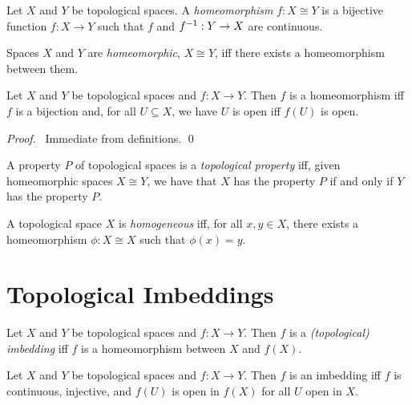 \begin{df}[Homeomorphism]
  Let $X$ and $Y$ be topological spaces. A \emph{homeomorphism} $f : X \cong Y$ is a bijective function $f : X \rightarrow Y$ such that $f$ and ${f}^{-1} : Y \rightarrow X$ are continuous.

  Spaces $X$ and $Y$ are \emph{homeomorphic}, $X \cong Y$, iff there exists a homeomorphism between them.
\end{df}

\begin{prop}
  Let $X$ and $Y$ be topological spaces and $f : X \rightarrow Y$. Then $f$ is a homeomorphism iff $f$ is a bijection and, for all $U \subseteq X$, we have $U$ is open iff $f(U)$ is open.
\end{prop}

\begin{proof}
  \pf\ Immediate from definitions. \qed
\end{proof}

\begin{df}
  A property $P$ of topological spaces is a \emph{topological property} iff, given homeomorphic spaces $X \cong Y$, we have that $X$ has the property $P$ if and only if $Y$ has the property $P$.
\end{df}

\begin{df}[Homogeneous]
  A topological space $X$ is \emph{homogeneous} iff, for all $x, y \in X$, there exists a homeomorphism $\phi : X \cong X$ such that $\phi(x) = y$.
\end{df}

\section{Topological Imbeddings}

\begin{df}
  Let $X$ and $Y$ be topological spaces and $f : X \rightarrow Y$. Then $f$ is a \emph{(topological) imbedding} iff $f$ is a homeomorphism between $X$ and $f(X)$.
\end{df}

\begin{prop}
  \label{prop:imbedding}
  Let $X$ and $Y$ be topological spaces and $f : X \rightarrow Y$. Then $f$ is an imbedding iff $f$ is continuous, injective, and $f(U)$ is open in $f(X)$ for all $U$ open in $X$.
\end{prop}

